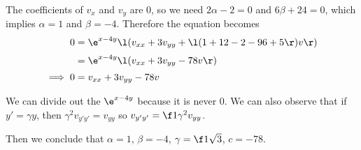 \documentclass[a4paper]{article}
\begin{document}
The coefficients of $v_x$ and $v_y$ are 0, so we need $2\alpha - 2 = 0$ and $6\beta + 24 = 0$, which implies $\alpha = 1$ and $\beta = -4$. Therefore the equation becomes
\begin{align*}
0 &= \e^{x - 4y} \l(
    v_{xx} + 3 v_{yy}
    + \l( 1 + 12 - 2 - 96 + 5 \r) v
\r) \\[0.5ex]
&= \e^{x - 4y} \l(
    v_{xx} + 3 v_{yy}
    - 78 v
\r) \\[0.5ex]
\implies 0 &= v_{xx} + 3 v_{yy} - 78 v
\end{align*}

We can divide out the $\e^{x - 4y}$ because it is never 0. We can also observe that if $y' = \gamma y$, then $\gamma^2 v_{y' y'} = v_{yy}$ so $v_{y' y'} = \f1{\gamma^2} v_{yy}$.

Then we conclude that $\alpha = 1$, $\beta = -4$, $\gamma = \f1{\sqrt3}$, $c = -78$.

\end{document}
